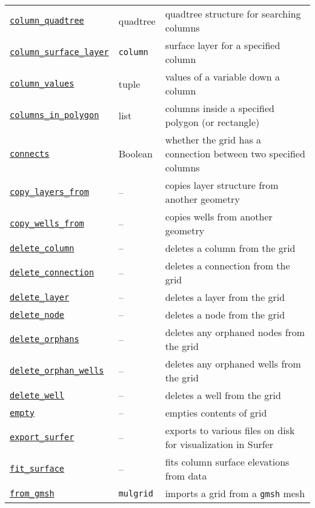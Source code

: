 \begin{center}
\begin{longtable}{|l|l|p{70mm}|}
  \hyperref[sec:column_quadtree]{\texttt{column\_quadtree}} & quadtree & quadtree structure for searching columns\\ 
  \hyperref[sec:column_surface_layer]{\texttt{column\_surface\_layer}} & \texttt{column} & surface layer for a specified column\\
  \hyperref[sec:column_values]{\texttt{column\_values}} & tuple & values of a variable down a column\\
  \hyperref[sec:columns_in_polygon]{\texttt{columns\_in\_polygon}} & list & columns inside a specified polygon (or rectangle)\\ 
  \hyperref[sec:connects]{\texttt{connects}} & Boolean & whether the grid has a connection between two specified columns\\ 
  \hyperref[sec:copy_layers_from]{\texttt{copy\_layers\_from}} & -- & copies layer structure from another geometry\\ 
  \hyperref[sec:copy_wells_from]{\texttt{copy\_wells\_from}} & -- & copies wells from another geometry\\ 
  \hyperref[sec:delete_column]{\texttt{delete\_column}} & -- & deletes a column from the grid\\ 
  \hyperref[sec:delete_connection]{\texttt{delete\_connection}} & -- & deletes a connection from the grid\\ 
  \hyperref[sec:delete_layer]{\texttt{delete\_layer}} & -- & deletes a layer from the grid\\ 
  \hyperref[sec:delete_node]{\texttt{delete\_node}} & -- & deletes a node from the grid\\ 
  \hyperref[sec:delete_orphans]{\texttt{delete\_orphans}} & -- & deletes any orphaned nodes from the grid\\ 
  \hyperref[sec:delete_orphan_wells]{\texttt{delete\_orphan\_wells}} & -- & deletes any orphaned wells from the grid\\ 
  \hyperref[sec:delete_well]{\texttt{delete\_well}} & -- & deletes a well from the grid\\ 
  \hyperref[sec:empty]{\texttt{empty}} & --  & empties contents of grid\\
  \hyperref[sec:export_surfer]{\texttt{export\_surfer}} & -- & exports to various files on disk for visualization in Surfer\\ 
  \hyperref[sec:fit_surface]{\texttt{fit\_surface}} & -- & fits column surface elevations from data\\ 
  \hyperref[sec:from_gmsh]{\texttt{from\_gmsh}} & \texttt{mulgrid} & imports a grid from a \texttt{gmsh} mesh\\ 

\end{longtable}
\end{center}
